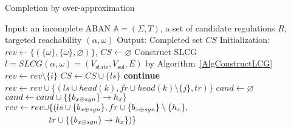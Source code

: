 \begin{algorithm}[ht]
\caption{Completion by over-approximation}\label{algComOver}
\begin{algorithmic}
    \State Input: an incomplete ABAN $\mathbb{A}=(\Sigma,T)$, a set of candidate regulations $R$, targeted reachability $(\alpha,\omega)$
    \State Output: Completed set $CS$ %
    \State Initialization: $rev\gets\{(\{\omega\},\{\omega\},\varnothing)\}$, $CS\gets \varnothing$
    \State Construct SLCG $l=SLCG(\alpha,\omega)=(V_{\mathrm{state}},V_{\mathrm{sol}}, E)$ by Algorithm~\ref{AlgConstructLCG}
        \State{}
    \EndIf
            \State $rev\gets rev \setminus\{i\}$
                \State $CS\gets CS\cup \{ls\}$
                \State \textbf{continue}
            \EndIf
                        \State $rev\gets rev\cup \{(ls\cup head(k), fr\cup head(k)\setminus \{j\},tr)\}$
                    \EndIf
                \EndFor
            \EndFor
            \State $cand\gets\varnothing$
                    \State $cand \gets cand\cup\{\acm{b_{x \oplus sgn}}{h_{1-x}}{h_x}\}$
                    \State 
                        $\begin{aligned}
                            rev\gets rev\cup &\{(ls\cup \{b_{x \oplus sgn}\}, fr\cup \{b_{x \oplus sgn}\}\setminus \{h_x\},\\
                            &tr\cup\{\acm{b_{x \oplus sgn}}{h_{1-x}}{h_x}\})\}
                        \end{aligned}$
                \EndIf
            \EndFor
        \EndFor
    \EndWhile
        \State{}
    \EndIf
    \State{}
\end{algorithmic}
\end{algorithm}

